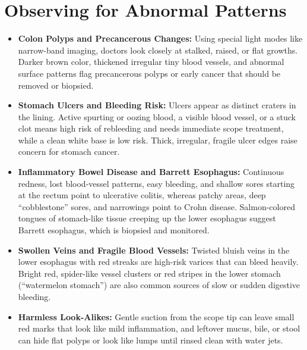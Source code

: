\section{Observing for Abnormal Patterns}
\begin{itemize}
\item \textbf{Colon Polyps and Precancerous Changes:} Using special light modes like narrow-band imaging, doctors look closely at stalked, raised, or flat growths. Darker brown color, thickened irregular tiny blood vessels, and abnormal surface patterns flag precancerous polyps or early cancer that should be removed or biopsied.
\item \textbf{Stomach Ulcers and Bleeding Risk:} Ulcers appear as distinct craters in the lining. Active spurting or oozing blood, a visible blood vessel, or a stuck clot means high risk of rebleeding and needs immediate scope treatment, while a clean white base is low risk. Thick, irregular, fragile ulcer edges raise concern for stomach cancer.
\item \textbf{Inflammatory Bowel Disease and Barrett Esophagus:} Continuous redness, lost blood-vessel patterns, easy bleeding, and shallow sores starting at the rectum point to ulcerative colitis, whereas patchy areas, deep ``cobblestone'' sores, and narrowings point to Crohn disease. Salmon-colored tongues of stomach-like tissue creeping up the lower esophagus suggest Barrett esophagus, which is biopsied and monitored.
\item \textbf{Swollen Veins and Fragile Blood Vessels:} Twisted bluish veins in the lower esophagus with red streaks are high-risk varices that can bleed heavily. Bright red, spider-like vessel clusters or red stripes in the lower stomach (``watermelon stomach'') are also common sources of slow or sudden digestive bleeding.
\item \textbf{Harmless Look-Alikes:} Gentle suction from the scope tip can leave small red marks that look like mild inflammation, and leftover mucus, bile, or stool can hide flat polyps or look like lumps until rinsed clean with water jets.
\end{itemize}


